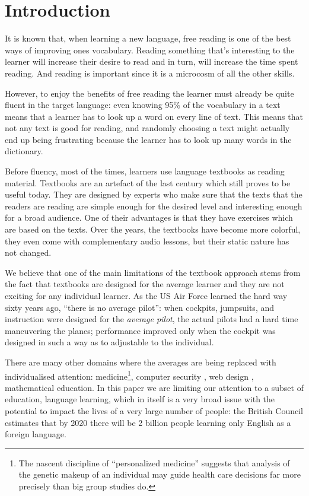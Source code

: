 
\section{Introduction}
It is known that, when learning a new language, free reading is one of the best ways of improving ones vocabulary. Reading something that's interesting to the learner will increase their desire to read and in turn, will increase the time spent reading. And reading is important since it is a microcosm of all the other skills. \cite{mccarthy1999-microcosm} 

However, to enjoy the benefits of free reading the learner must already be quite fluent in the target language: even knowing 95\% of the vocabulary in a text means that a learner has to look up a word on every line of text. \cite{Hirsh92-vocab-size} This means that not any text is good for reading, and randomly choosing a text might actually end up being frustrating because the learner has to look up many words in the dictionary.

Before fluency, most of the times, learners use language textbooks as reading material. Textbooks are an artefact of the last century which still proves to be useful today. They are designed by experts who make sure that the texts that the readers are reading are simple enough for the desired level and interesting enough for a broad audience. One of their advantages is that they have exercises which are based on the texts. Over the years, the textbooks have become more colorful, they even come with complementary audio lessons, but their static nature has not changed.

We believe that one of the main limitations of the textbook approach stems from the fact that textbooks are designed for the average learner and they are not exciting for any individual learner. As the US Air Force learned the hard way sixty years ago, ``there is no average pilot'': when cockpits, jumpsuits, and instruction were designed for the {\em average pilot}, the actual pilots had a hard time maneuvering the planes; performance improved only when the cockpit was designed in such a way as to adjustable to the individual. 

There are many other domains where the averages are being replaced with individualised attention: medicine\footnote{The nascent discipline of ``personalized medicine'' suggests that analysis of the genetic makeup of an individual may guide health care decisions far more precisely than big group studies do.}, computer security , web design\cite{Reinecke13-CulturalAdaptation} , mathematical education\cite{Polozov15-AdaptableMath}. In this paper we are limiting our attention to a subset of education, language learning, which in itself is a very broad issue with the potential to impact the lives of a very large number of people: the British Council estimates that by 2020 there will be 2 billion people learning only English as a foreign language. 

